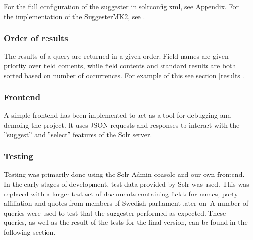 For the full configuration of the suggester in solrconfig.xml, see Appendix.
For the implementation of the SuggesterMK2, see \cite{GITHUBPROJ}.

\subsubsection{Order of results}

The results of a query are returned in a given order. Field names are given priority over field contents, while field contents and standard results are both sorted based on number of occurrences. For example of this see section \ref{results}.

\subsubsection{Frontend}

A simple frontend has been implemented to act as a tool for debugging and demoing the project. It uses JSON requests and responses to interact with the ''suggest'' and ''select'' features of the Solr server.

\subsubsection{Testing}

Testing was primarily done using the Solr Admin console and our own frontend.
In the early stages of development, test data provided by Solr was used. This was replaced with a larger test set of documents containing fields for names, party affiliation and quotes from members of Swedish parliament later on. A number of queries were used to test that the suggester performed as expected. These queries, as well as the result of the tests for the final version, can be found in the following section. 
